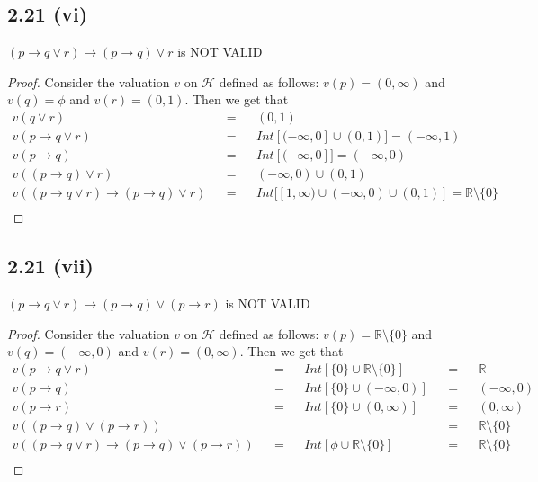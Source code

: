 \documentclass[12pt]{article}
\begin{document}
\subsection*{2.21 (vi)} 
$(p \rightarrow q \vee r) \rightarrow (p \rightarrow q) \vee r$ is NOT VALID
\begin{proof}
Consider the valuation $v$ on $\mathcal{H}$ defined as follows: $v(p) = (0, \infty)$ and $v(q) = \phi$ and $v(r) = (0,1)$. Then we get that
\begin{align*}
    v(q \vee r) &&=&& (0,1) \\
    v(p \rightarrow q \vee r) &&=&& Int[(-\infty, 0] \cup (0,1)] = (-\infty, 1) \\
    v(p \rightarrow q) &&=&& Int[(-\infty, 0]] = (-\infty, 0) \\
    v((p \rightarrow q) \vee r) &&=&& (-\infty, 0) \cup (0,1) \\
    v((p \rightarrow q \vee r) \rightarrow (p \rightarrow q) \vee r) &&=&& Int[[1, \infty) \cup (-\infty, 0) \cup (0,1)] = \mathbb{R} \setminus \{0\} \\
\end{align*}
\end{proof}

\subsection*{2.21 (vii)} 
$(p \rightarrow q \vee r) \rightarrow (p \rightarrow q) \vee (p \rightarrow r)$ is NOT VALID
\begin{proof}
Consider the valuation $v$ on $\mathcal{H}$ defined as follows: $v(p) = \mathbb{R} \setminus \{0\}$ and $v(q) = (-\infty, 0)$ and $v(r) = (0,\infty)$. Then we get that
\begin{align*}
    v(p \rightarrow q \vee r) &&=&& Int[\{0\} \cup \mathbb{R} \setminus \{0\}] &&=&& \mathbb{R} \\
    v(p \rightarrow q) &&=&& Int[\{0\} \cup (-\infty, 0)] &&=&& (-\infty, 0) \\
    v(p \rightarrow r) &&=&& Int[\{0\} \cup (0, \infty)] &&=&& (0, \infty) \\
    v((p \rightarrow q) \vee (p \rightarrow r)) &&&& &&=&& \mathbb{R} \setminus \{0\} \\
    v((p \rightarrow q \vee r) \rightarrow (p \rightarrow q) \vee (p \rightarrow r)) &&=&& Int[\phi \cup \mathbb{R} \setminus \{0\}] &&=&& \mathbb{R} \setminus \{0\} \\
\end{align*}
\end{proof}
\end{document}
